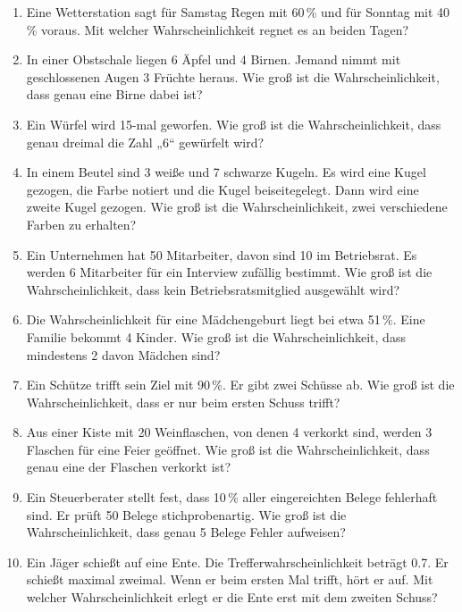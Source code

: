 \begin{enumerate}
\item
  Eine Wetterstation sagt für Samstag Regen mit 60\,\% und für Sonntag mit 40\,\%
  voraus. Mit welcher Wahrscheinlichkeit regnet es an beiden Tagen?
  \newpage
\item
  In einer Obstschale liegen 6 Äpfel und 4 Birnen. Jemand nimmt mit
geschlossenen Augen 3 Früchte heraus. Wie groß ist die Wahrscheinlichkeit,
dass genau eine Birne dabei ist?
\item
  Ein Würfel wird 15-mal geworfen. Wie groß ist die Wahrscheinlichkeit, dass
  genau dreimal die Zahl „6“ gewürfelt wird?
\item
  In einem Beutel sind 3 weiße und 7 schwarze Kugeln. Es wird eine Kugel
gezogen, die Farbe notiert und die Kugel beiseitegelegt. Dann wird eine zweite
Kugel gezogen. Wie groß ist die Wahrscheinlichkeit, zwei verschiedene Farben
zu erhalten?
\item
  Ein Unternehmen hat 50 Mitarbeiter, davon sind 10 im Betriebsrat. Es werden
6 Mitarbeiter für ein Interview zufällig bestimmt. Wie groß ist die
Wahrscheinlichkeit, dass kein Betriebsratsmitglied ausgewählt wird?
\item
  Die Wahrscheinlichkeit für eine Mädchengeburt liegt bei etwa 51\,\%. Eine
Familie bekommt 4 Kinder. Wie groß ist die Wahrscheinlichkeit, dass
mindestens 2 davon Mädchen sind?
\item
  Ein Schütze trifft sein Ziel mit 90\,\%. Er gibt zwei Schüsse ab. Wie groß ist die
Wahrscheinlichkeit, dass er nur beim ersten Schuss trifft?
\item
  Aus einer Kiste mit 20 Weinflaschen, von denen 4 verkorkt sind, werden 3
Flaschen für eine Feier geöffnet. Wie groß ist die Wahrscheinlichkeit, dass
genau eine der Flaschen verkorkt ist?
\item
  Ein Steuerberater stellt fest, dass 10\,\% aller eingereichten Belege fehlerhaft
sind. Er prüft 50 Belege stichprobenartig. Wie groß ist die Wahrscheinlichkeit,
dass genau 5 Belege Fehler aufweisen?
\item
  Ein Jäger schießt auf eine Ente. Die Trefferwahrscheinlichkeit beträgt 0.7. Er
schießt maximal zweimal. Wenn er beim ersten Mal trifft, hört er auf. Mit
welcher Wahrscheinlichkeit erlegt er die Ente erst mit dem zweiten Schuss?

\end{enumerate}
\newpage
